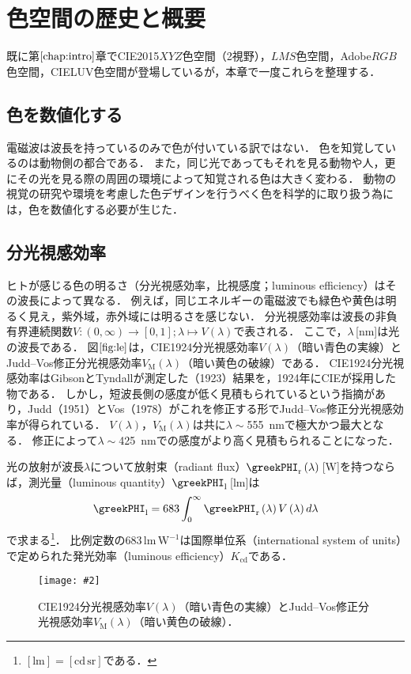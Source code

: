 \documentclass[uplatex,paper=a4,fontsize=4.0truemm,jafontsize=4.0truemm,head_space=30.0truemm,foot_space=30.0truemm,baselineskip=8.0truemm,line_length=40zw,gutter=25.0truemm,oneside,openany,fleqn,hanging_panctuation,open_bracket_pos=nibu_tentsuki,dvipdfmx,jis2004,book,titlepage]{jlreq}
\theoremstyle{mystyle}
\newcommand{\captiondot}[1]{\caption{#1．}}
\newcommand{\figureinput}[4]{\begin{figure}[btp]\centering\texttt{[image: \#2]}\captiondot{#3}\label{fig:#4}\end{figure}}
\newcommand{\mathdisplaystyle}[1]{\(\displaystyle{#1}\)}
\newcommand{\Reference}[1]{\mathdisplaystyle{\ref{#1}}}
\newcommand{\negativevalue}[1]{{-#1}}
\newcommand{\parentheses}[1]{\left(#1\right)}
\newcommand{\squarebrackets}[1]{\left[#1\right]}
\begin{document}
	\chapter{色空間の歴史と概要}
		既に第\Reference{chap:intro}章でCIE2015\mathdisplaystyle{XYZ}色空間（2\textdegree 視野），\mathdisplaystyle{LMS}色空間，Adobe\mathdisplaystyle{RGB}色空間，CIELUV色空間が登場しているが，本章で一度これらを整理する．
		\section{色を数値化する}
			電磁波は波長を持っているのみで色が付いている訳ではない．
			色を知覚しているのは動物側の都合である．
			また，同じ光であってもそれを見る動物や人，更にその光を見る際の周囲の環境によって知覚される色は大きく変わる．
			動物の視覚の研究や環境を考慮した色デザインを行うべく色を科学的に取り扱う為には，色を数値化する必要が生じた．
		\section{分光視感効率}
			ヒトが感じる色の明るさ（分光視感効率，比視感度；luminous efficiency）はその波長によって異なる．
			例えば，同じエネルギーの電磁波でも緑色や黄色は明るく見え，紫外域，赤外域には明るさを感じない．
			分光視感効率は波長の非負有界連続関数\mathdisplaystyle{V\colon\parentheses{0,\infty}\to\squarebrackets{0,1};\lambda\mapsto V\parentheses{\lambda}}で表される．
			ここで，\mathdisplaystyle{\lambda}\,[nm]は光の波長である．
			図\Reference{fig:le}は，CIE1924分光視感効率\mathdisplaystyle{V\parentheses{\lambda}}（暗い青色の実線）とJudd--Vos修正分光視感効率\mathdisplaystyle{V_\textrm{M}\parentheses{\lambda}}\cite{Vos1978}（暗い黄色の破線）である．
			CIE1924分光視感効率はGibsonとTyndallが測定した（1923）結果を，1924年にCIEが採用した物である．
			しかし，短波長側の感度が低く見積もられているという指摘があり，Judd（1951）とVos（1978）がこれを修正する形でJudd--Vos修正分光視感効率が得られている．
			\mathdisplaystyle{V\parentheses{\lambda}}，\mathdisplaystyle{V_\textrm{M}\parentheses{\lambda}}は共に\mathdisplaystyle{\lambda\sim{}}\SI{555}{nm}で極大かつ最大となる．
			修正によって\mathdisplaystyle{\lambda\sim{}}\SI{425}{nm}での感度がより高く見積もられることになった．

			光の放射が波長\mathdisplaystyle{\lambda}について放射束（radiant flux）\mathdisplaystyle{\greekPHI_\textrm{r}\parentheses{\lambda}}\,[W]を持つならば，測光量（luminous quantity）\mathdisplaystyle{\greekPHI_\textrm{l}}\,[lm]は
			\begin{equation*}
				\greekPHI_\textrm{l}=683\int_0^\infty{\greekPHI_\textrm{r}\parentheses{\lambda}V\parentheses{\lambda}}\,d\lambda
			\end{equation*}
			で求まる\footnote{\mathdisplaystyle{[\textrm{lm}]=[\textrm{cd}\,\textrm{sr}]}である．}．
			比例定数の683\,lm\,\mathdisplaystyle{\textrm{W}^{\negativevalue{1}}}は国際単位系（international system of units）で定められた発光効率（luminous efficiency）\mathdisplaystyle{K_\textrm{cd}}である．
			\figureinput{width=\linewidth}{D:/a/figs/le.png}{CIE1924分光視感効率\mathdisplaystyle{V\parentheses{\lambda}}（暗い青色の実線）とJudd--Vos修正分光視感効率\mathdisplaystyle{V_\textrm{M}\parentheses{\lambda}}（暗い黄色の破線）}{le}
\end{document}
